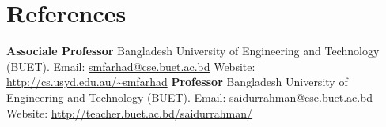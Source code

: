 \documentclass[11pt,a4paper,sans]{moderncv}
\begin{document}
\renewcommand{\listitemsymbol}{-~} %


\section{References}
{
\textbf{Associale Professor\newline}
Bangladesh University of Engineering and Technology (BUET).\newline
Email: \url{smfarhad@cse.buet.ac.bd} \newline
Website: \url{http://cs.usyd.edu.au/~smfarhad}
}
{
\textbf{Professor\newline}
Bangladesh University of Engineering and Technology (BUET).\newline
Email: \url{saidurrahman@cse.buet.ac.bd} \newline
Website: \url{http://teacher.buet.ac.bd/saidurrahman/}
}
\end{document}

